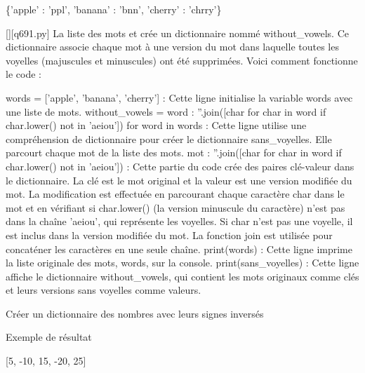 \{'apple' : 'ppl', 'banana' : 'bnn', 'cherry' : 'chrry'\}
        \par
        \begin{solution}
            \renewcommand{\nomfichier}{q691.py}
            \pythonfile{\chemincode \nomfichier}[][\nomfichier]
            La liste des mots et crée un dictionnaire nommé without_vowels. Ce dictionnaire associe chaque mot à une version du mot dans laquelle toutes les voyelles (majuscules et minuscules) ont été supprimées. Voici comment fonctionne le code :

    words = ['apple', 'banana', 'cherry'] : Cette ligne initialise la variable words avec une liste de mots.
    without_vowels = {word : ''.join([char for char in word if char.lower() not in 'aeiou']) for word in words} : Cette ligne utilise une compréhension de dictionnaire pour créer le dictionnaire sans_voyelles. Elle parcourt chaque mot de la liste des mots.
        {mot : ''.join([char for char in word if char.lower() not in 'aeiou'])} : Cette partie du code crée des paires clé-valeur dans le dictionnaire. La clé est le mot original et la valeur est une version modifiée du mot. La modification est effectuée en parcourant chaque caractère char dans le mot et en vérifiant si char.lower() (la version minuscule du caractère) n'est pas dans la chaîne 'aeiou', qui représente les voyelles. Si char n'est pas une voyelle, il est inclus dans la version modifiée du mot. La fonction join est utilisée pour concaténer les caractères en une seule chaîne.
    print(words) : Cette ligne imprime la liste originale des mots, words, sur la console.
    print(sans_voyelles) : Cette ligne affiche le dictionnaire without_vowels, qui contient les mots originaux comme clés et leurs versions sans voyelles comme valeurs.
        \end{solution}
        

        \question
        Créer un dictionnaire des nombres avec leurs signes inversés

Exemple de résultat

[5, -10, 15, -20, 25]

